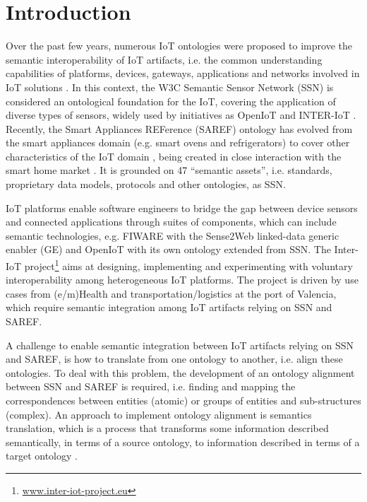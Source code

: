 \documentclass{sig-alternate-05-2015}
\begin{document}
\section{Introduction}

Over the past few years, numerous IoT ontologies were proposed to improve the semantic interoperability of IoT artifacts, i.e. the common understanding capabilities of platforms, devices, gateways, applications and networks involved in IoT solutions \cite{Ganzha2016a}. In this context, the W3C Semantic Sensor Network (SSN) is considered an ontological foundation for the IoT, covering the application of diverse types of sensors, widely used by initiatives as OpenIoT \cite{Soldatos2015} and INTER-IoT \cite{Ganzha2017a}. 
Recently, the Smart Appliances REFerence (SAREF) ontology has evolved from the smart appliances domain (e.g. smart ovens and refrigerators) \cite{Daniele2015} to cover other characteristics of the IoT domain \cite{Daniele2016b}, being created in close interaction with the smart home market \cite{Daniele2016}. It is grounded on 47 “semantic assets”, i.e. standards, proprietary data models, protocols and other ontologies, as SSN. 

IoT platforms enable software engineers to bridge the gap between device sensors and connected applications through suites of components, which can include semantic technologies, e.g. FIWARE with the Sense2Web linked-data generic enabler (GE) and OpenIoT with its own ontology extended from SSN. The Inter-IoT project\footnote{\url{www.inter-iot-project.eu}} aims at designing, implementing and experimenting with voluntary interoperability among heterogeneous IoT platforms. The project is driven by use cases from (e/m)Health and transportation/logistics at the port of Valencia, which require semantic integration among IoT artifacts relying on SSN and SAREF.  

A challenge to enable semantic integration between IoT artifacts relying on SSN and SAREF, is how to translate from one ontology to another, i.e. align these ontologies. To deal with this problem, the development of an ontology alignment between SSN and SAREF is required, i.e. finding and mapping the correspondences between entities (atomic) or groups of entities and sub-structures (complex). An approach to implement ontology alignment is semantics translation, which is a process that transforms some information described semantically, in terms of a source ontology, to information described in terms of a target ontology \cite{Ganzha2015}. 
\end{document}
